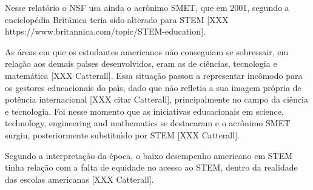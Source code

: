 \documentclass[
12pt,		%
openright,	%
twoside,  %
a4paper,			%
chapter=TITLE,		%
english,			%
french,				%
spanish,			%
brazil				%
]{USPSC-classe/USPSC}
\begin{document}
\noindent\begin{center}\mbox{\centering{}}\end{center}


Nesse relat\'orio o NSF usa ainda o acr\^onimo SMET, que em 2001, segundo a enciclop\'edia Brit\^anica teria sido alterado para STEM [XXX https://www.britannica.com/topic/STEM-education].














As \'areas em que os estudantes americanos n\~ao conseguiam se sobressair, em rela\c{c}\~ao aos demais pa\'{\i}ses desenvolvidos, eram as de ci\^encias, tecnologia e matem\'atica [XXX Catterall]. Essa situa\c{c}\~ao passou a representar inc\^omodo para os gestores educacionais do pa\'{\i}s, dado que n\~ao refletia a sua imagem pr\'opria de pot\^encia internacional [XXX citar Catterall], principalmente no campo da ci\^encia e tecnologia. Foi nesse momento que as iniciativas educacionais em \textquotedbl science, technology, engineering and mathematics se destacaram e o acr\^onimo SMET surgiu, posteriormente substitu\'{\i}do por STEM [XXX  Catterall].














Segundo a interpreta\c{c}\~ao da \'epoca, o baixo desempenho americano em STEM tinha rela\c{c}\~ao com a falta de equidade no acesso ao STEM, dentro da realidade das escolas americanas [XXX Catterall].
\end{document}
